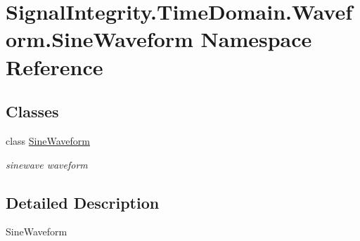 \hypertarget{namespaceSignalIntegrity_1_1TimeDomain_1_1Waveform_1_1SineWaveform}{}\section{Signal\+Integrity.\+Time\+Domain.\+Waveform.\+Sine\+Waveform Namespace Reference}
\label{namespaceSignalIntegrity_1_1TimeDomain_1_1Waveform_1_1SineWaveform}
\subsection*{Classes}
\begin{DoxyCompactItemize}
\item 
class \hyperlink{classSignalIntegrity_1_1TimeDomain_1_1Waveform_1_1SineWaveform_1_1SineWaveform}{Sine\+Waveform}
\begin{DoxyCompactList}\small\item\em sinewave waveform \end{DoxyCompactList}\end{DoxyCompactItemize}


\subsection{Detailed Description}
\begin{DoxyVerb}SineWaveform\end{DoxyVerb}
 